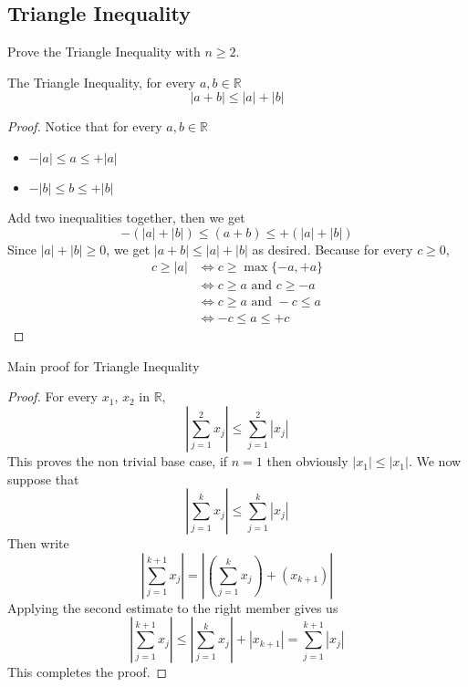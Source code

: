 \documentclass[../../main.tex]{subfiles}
\begin{document}
\subsection{Triangle Inequality}
\begin{wts}
    Prove the Triangle Inequality with $n\geq 2$.
\end{wts}
\newcommand{\sumn}[1]{\sum_{j=1}^{#1}}
\begin{lemma}
    The Triangle Inequality, for every $a, b\in\mathbb{R}$
    \[
    |a+b|\leq |a| + |b|
    \]
\end{lemma}
\begin{proof}
    Notice that for every $a,b \in \mathbb{R}$
    \begin{itemize}
        \item $-|a|\leq a\leq +|a|$
        \item $-|b|\leq b\leq +|b|$
    \end{itemize}
    Add two inequalities together, then we get
    \[
    -\left(|a| + |b|\right)\leq (a + b) \leq +\left(|a| + |b|\right)
    \]
    Since $|a| + |b|\geq 0$, we get $|a+b|\leq |a| + |b|$ as desired. Because for every $c\geq 0$,
    \begin{align*}
        c\geq |a|&\iff c\geq\max{\{-a, +a\}}\\
        &\iff c\geq a\text{ and }c\geq -a\\
        &\iff c\geq a\text{ and }-c\leq a\\
        &\iff -c\leq a\leq +c
    \end{align*}
\end{proof}
Main proof for Triangle Inequality
\begin{proof}
    For every $x_1$, $x_2$ in $\mathbb{R}$,
    \[
    \left|\sumn{2} x_j\right|\leq \sumn{2}\left|x_j\right|
    \]
    This proves the non trivial base case, if $n=1$ then obviously $|x_1|\leq |x_1|$. We now suppose that
    \[
    \left|\sumn{k} x_j\right|\leq \sumn{k}\left|x_j\right|
    \]
    Then write
    \[
    \left|\sumn{k+1} x_j\right| = \left|\left(\sumn{k} x_j\right) + (x_{k+1})\right| 
    \]
    Applying the second estimate to the right member gives us
    \[
    \left|\sumn{k+1} x_j\right|\leq \left|\sumn{k} x_j\right| + \left|x_{k+1}\right|= \sumn{k+1}\left|x_j\right|
    \]
    This completes the proof.
\end{proof}
\end{document}
